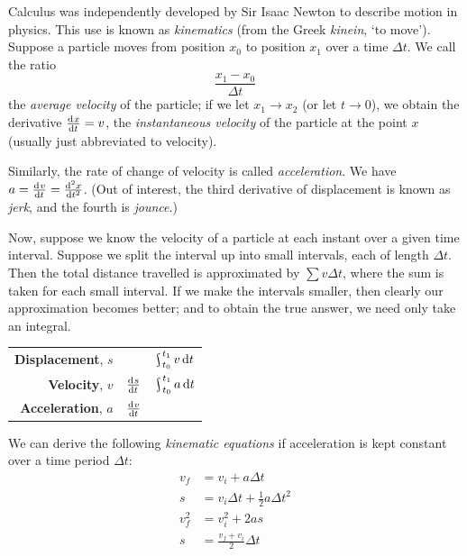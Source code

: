 


Calculus was independently developed by Sir Isaac Newton to describe motion in physics. This use is known as \textit{kinematics} (from the
Greek \textit{kinein}, `to move'). Suppose a particle moves from position $ x_0 $ to position $ x_1 $ over a time $ \Delta t $. We call the
ratio
\begin{displaymath}
  \frac{x_1 - x_0}{\Delta t}
\end{displaymath}
the \textit{average velocity} of the particle; if we let $ x_1 \to x_2 $ (or let $ t \to 0 $), we obtain the derivative $ \od{x}{t} = v $, the
\textit{instantaneous velocity} of the particle at the point $ x $ (usually just abbreviated to velocity).

Similarly, the rate of change of velocity is called \textit{acceleration}. We have $ a = \od{v}{t} = \od[2]{x}{t} $. (Out of interest, the third
derivative of displacement is known as \textit{jerk}, and the fourth is \textit{jounce}.)

Now, suppose we know the velocity of a particle at each instant over a given time interval. Suppose we split the interval up into small intervals,
each of length $ \Delta t $. Then the total distance travelled is approximated by $ \sum v \Delta t $, where the sum is taken for each small interval.
If we make the intervals smaller, then clearly our approximation becomes better; and to obtain the true answer, we need only take an integral.

\begin{center}
  \def\arraystretch{1.5}
  \begin{tabular}{|rcc|}\hline
    \textbf{Displacement}, $ s $ && $\rint_{t_0}^{t_1} v \dif{t} $\\
    \textbf{Velocity}, $ v $ & $ \od{s}{t} $ & $ \rint_{t_0}^{t_1} a \dif{t} $\\
    \textbf{Acceleration}, $ a $ & $ \od{v}{t} $ &\\\hline
  \end{tabular}
\end{center}

We can derive the following \textit{kinematic equations} if acceleration is kept constant over a time period $ \Delta t $:
\begin{align*}
  v_f &= v_i + a \Delta t\\
  s &= v_i \Delta t + \frac{1}{2} a {\Delta t}^2\\
  v_f^2 &= v_i^2 + 2a s\\
  s &= \frac{v_f + v_i}{2} \Delta t
\end{align*}

